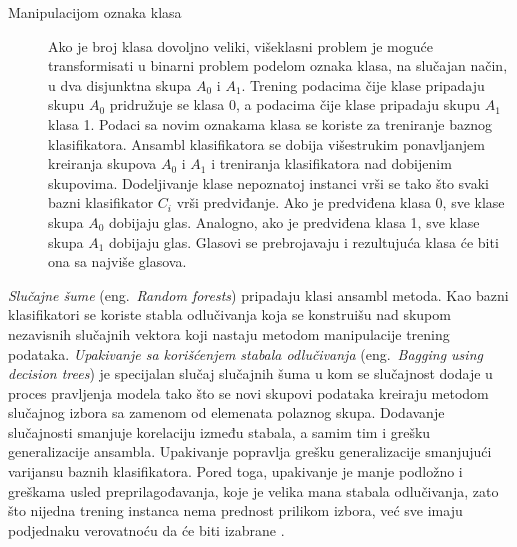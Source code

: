 \documentclass[12pt,oneside]{memoir}
\begin{document}
\begin{description}
\item[Manipulacijom oznaka klasa] Ako je broj klasa dovoljno veliki, višeklasni problem je moguće transformisati u binarni problem podelom oznaka klasa, na slučajan način, u dva disjunktna skupa $A_0$ i $A_1$. Trening podacima čije klase pripadaju skupu $A_0$ pridružuje se klasa 0, a podacima čije klase pripadaju skupu $A_1$ klasa 1. Podaci sa novim oznakama klasa se koriste za treniranje baznog klasifikatora. Ansambl klasifikatora se dobija višestrukim ponavljanjem kreiranja skupova $A_0$ i $A_1$ i treniranja klasifikatora nad dobijenim skupovima. Dodeljivanje klase nepoznatoj instanci vrši se tako što svaki bazni klasifikator $C_i$ vrši predviđanje. Ako je predviđena klasa 0, sve klase skupa $A_0$ dobijaju glas. Analogno, ako je predviđena klasa 1, sve klase skupa $A_1$ dobijaju glas. Glasovi se prebrojavaju i rezultujuća klasa će biti ona sa najviše glasova. \par
\end{description}




\textit{Slučajne šume} (eng.~\textit{Random forests}) pripadaju klasi ansambl metoda. Kao bazni klasifikatori se koriste stabla odlučivanja koja se konstruišu nad skupom nezavisnih slučajnih vektora koji nastaju metodom manipulacije trening podataka. \textit{Upakivanje sa korišćenjem stabala odlučivanja} (eng.~\textit{Bagging using decision trees}) je specijalan slučaj slučajnih šuma u kom se slučajnost dodaje u proces pravljenja modela tako što se novi skupovi podataka kreiraju metodom slučajnog izbora sa zamenom od elemenata polaznog skupa. Dodavanje slučajnosti smanjuje korelaciju između stabala, a samim tim i grešku generalizacije ansambla. %
Upakivanje popravlja grešku generalizacije smanjujući varijansu baznih klasifikatora. Pored toga, upakivanje je manje podložno i greškama usled preprilagođavanja, koje je velika mana stabala odlučivanja, zato što nijedna trening instanca nema prednost prilikom izbora, već sve imaju podjednaku verovatnoću da će biti izabrane \cite{mitic}.
\end{document}

